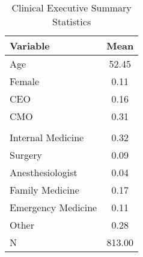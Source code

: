\begin{table}[ht!]
\centering
\caption{\label{doc_sumstats}Clinical Executive Summary Statistics}
\centering
\begin{tabular}[t]{p{6cm} c}
\toprule
Variable & Mean\\
\midrule
Age & 52.45\\
Female & 0.11\\
CEO & 0.16\\
CMO & 0.31\\
\addlinespace[0.3em]
\multicolumn{2}{l}{\textbf{Specialty}}\\
\hspace{1em}Internal Medicine & 0.32\\
\hspace{1em}Surgery & 0.09\\
\hspace{1em}Anesthesiologist & 0.04\\
\hspace{1em}Family Medicine & 0.17\\
\hspace{1em}Emergency Medicine & 0.11\\
\hspace{1em}Other & 0.28\\
\addlinespace[0.3em]
N & 813.00\\
\bottomrule
\end{tabular}
\end{table}
